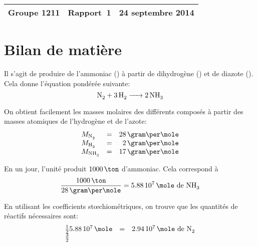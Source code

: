 \documentclass[a4paper,12pt]{article}
\begin{document}
\begin{center}
\begin{tabu} to \textwidth {lX[c]r}
    Groupe 1211 & Rapport~1 & 24 septembre 2014 \\
    \hline
\end{tabu}
\end{center}

\section{Bilan de matière}

Il s'agit de produire de l'ammoniac () à partir de dihydrogène ()
et de diazote ().
Cela donne l'équation pondérée suivante:
\[\ce{N2 + 3H2 -> 2NH3}\]

On obtient facilement les masses molaires des différents composés à partir
des masses atomiques de l'hydrogène et de l'azote:
\[
    \begin{array}{lcr}
        M_{\ce{N2}} &=& 28\,\gram\per\mole\\
        M_{\ce{H2}} &=& 2\,\gram\per\mole\\
        M_{\ce{NH3}} &=& 17\,\gram\per\mole\\
    \end{array}
\]

En un jour, l'unité produit $1000\,\ton$ d'ammoniac.
Cela correspond à
\[\frac{1000\,\ton}{28\,\gram\per\mole} = 5.88\,10^7\,\mole\mbox{ de \ce{NH3}}\]

En utilisant les coefficients stœchiométriques, on trouve que les quantités de
réactifs nécessaires sont:
\[
    \begin{array}{lcr}
        \frac{1}{2} 5.88\,10^7\,\mole &=& 2.94\,10^7\,\mole
        \mbox{ de \ce{N2}} \\
        \frac{3}{2}
    \end{array}
\]
\end{document}
